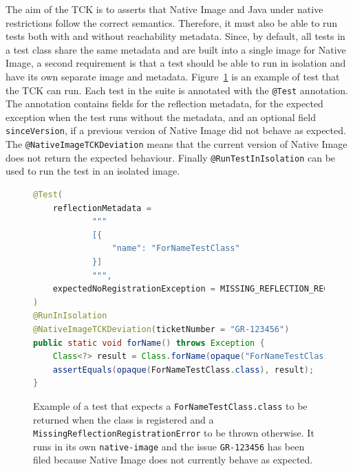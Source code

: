 The aim of the TCK is to asserts that Native Image and Java under native restrictions follow the correct semantics. Therefore, it must also be able to run tests both with and without reachability metadata. Since, by default, all tests in a test class share the same metadata and are built into a single image for Native Image, a second requirement is that a test should be able to run in isolation and have its own separate image and metadata. 
Figure~\ref{fig:tck_for_name} is an example of test that the TCK can run. Each test in the suite is annotated with the \verb|@Test| annotation. The annotation contains fields for the reflection metadata, for the expected exception when the test runs without the metadata, and an optional field \verb|sinceVersion|, if a previous version of Native Image did not behave as expected. The \verb|@NativeImageTCKDeviation| means that the current version of Native Image does not return the expected behaviour. Finally \verb|@RunTestInIsolation| can be used to run the test in an isolated image. 

\begin{figure}[ht]
    \centering
\begin{lstlisting}[language=Java]
@Test(
    reflectionMetadata =
            """
            [{
                "name": "ForNameTestClass"
            }]
            """,
    expectedNoRegistrationException = MISSING_REFLECTION_REGISTRATION_ERROR
)
@RunInIsolation
@NativeImageTCKDeviation(ticketNumber = "GR-123456")
public static void forName() throws Exception {
    Class<?> result = Class.forName(opaque("ForNameTestClass"));
    assertEquals(opaque(ForNameTestClass.class), result);
}
\end{lstlisting}
    \caption{Example of a test that expects a \texttt{ForNameTestClass.class} to be returned when the class is registered and a \texttt{MissingReflectionRegistrationError} to be thrown otherwise. It runs in its own \texttt{native-image} and the issue \texttt{GR-123456} has been filed because Native Image does not currently behave as expected.}
    \label{fig:tck_for_name}
\end{figure}

